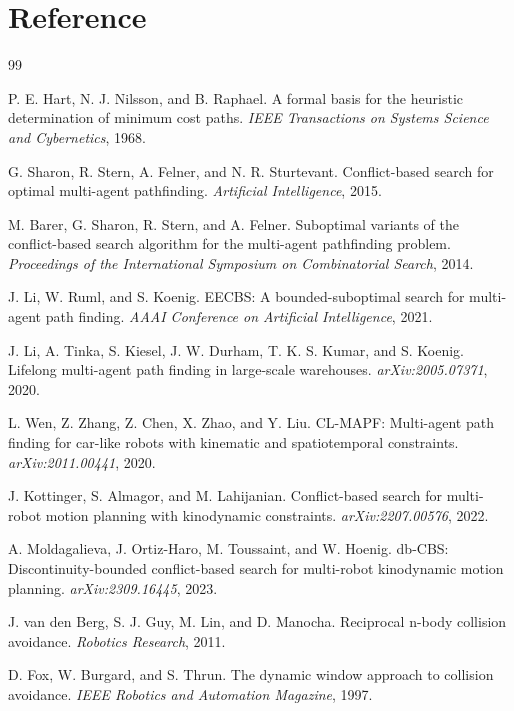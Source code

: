 \documentclass[10pt,twocolumn,letterpaper]{article}
\begin{document}
\section{Reference}
\begin{thebibliography}{99}

P. E. Hart, N. J. Nilsson, and B. Raphael.
A formal basis for the heuristic determination of minimum cost paths.
\emph{IEEE Transactions on Systems Science and Cybernetics}, 1968.

G. Sharon, R. Stern, A. Felner, and N. R. Sturtevant.
Conflict-based search for optimal multi-agent pathfinding.
\emph{Artificial Intelligence}, 2015.

M. Barer, G. Sharon, R. Stern, and A. Felner.
Suboptimal variants of the conflict-based search algorithm for the multi-agent pathfinding problem.
\emph{Proceedings of the International Symposium on Combinatorial Search}, 2014.

J. Li, W. Ruml, and S. Koenig.
EECBS: A bounded-suboptimal search for multi-agent path finding.
\emph{AAAI Conference on Artificial Intelligence}, 2021.

J. Li, A. Tinka, S. Kiesel, J. W. Durham, T. K. S. Kumar, and S. Koenig.
Lifelong multi-agent path finding in large-scale warehouses.
\emph{arXiv:2005.07371}, 2020.

L. Wen, Z. Zhang, Z. Chen, X. Zhao, and Y. Liu.
CL-MAPF: Multi-agent path finding for car-like robots with kinematic and spatiotemporal constraints.
\emph{arXiv:2011.00441}, 2020.

J. Kottinger, S. Almagor, and M. Lahijanian.
Conflict-based search for multi-robot motion planning with kinodynamic constraints.
\emph{arXiv:2207.00576}, 2022.

A. Moldagalieva, J. Ortiz-Haro, M. Toussaint, and W. Hoenig.
db-CBS: Discontinuity-bounded conflict-based search for multi-robot kinodynamic motion planning.
\emph{arXiv:2309.16445}, 2023.

J. van den Berg, S. J. Guy, M. Lin, and D. Manocha.
Reciprocal n-body collision avoidance.
\emph{Robotics Research}, 2011.

D. Fox, W. Burgard, and S. Thrun.
The dynamic window approach to collision avoidance.
\emph{IEEE Robotics and Automation Magazine}, 1997.


\end{thebibliography}
\end{document}
